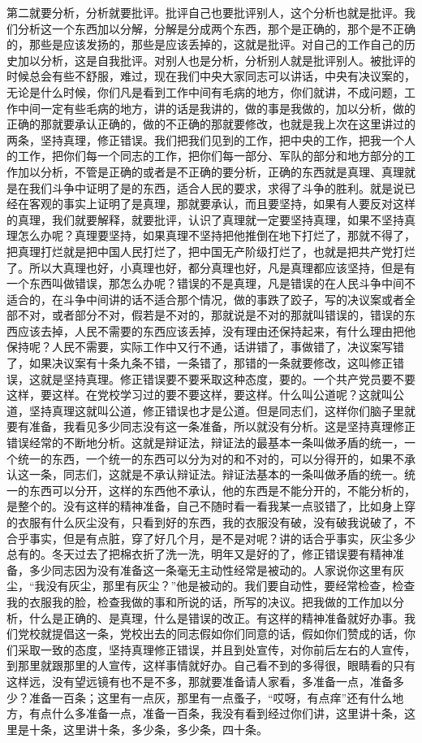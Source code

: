 第二就要分析，分析就要批评。批评自己也要批评别人，这个分析也就是批评。我们分析这一个东西加以分解，分解是分成两个东西，那个是正确的，那个是不正确的，那些是应该发扬的，那些是应该丢掉的，这就是批评。对自己的工作自己的历史加以分析，这是自我批评。对别人也是分析，分析别人就是批评别人。被批评的时候总会有些不舒服，难过，现在我们中央大家同志可以讲话，中央有决议案的，无论是什么时候，你们凡是看到工作中间有毛病的地方，你们就讲，不成问题，工作中间一定有些毛病的地方，讲的话是我讲的，做的事是我做的，加以分析，做的正确的那就要承认正确的，做的不正确的那就要修改，也就是我上次在这里讲过的两条，坚持真理，修正错误。我们把我们见到的工作，把中央的工作，把我一个人的工作，把你们每一个同志的工作，把你们每一部分、军队的部分和地方部分的工作加以分析，不管是正确的或者是不正确的要分析，正确的东西就是真理、真理就是在我们斗争中证明了是的东西，适合人民的要求，求得了斗争的胜利。就是说已经在客观的事实上证明了是真理，那就要承认，而且要坚持，如果有人要反对这样的真理，我们就要解释，就要批评，认识了真理就一定要坚持真理，如果不坚持真理怎么办呢？真理要坚持，如果真理不坚持把他推倒在地下打烂了，那就不得了，把真理打烂就是把中国人民打烂了，把中国无产阶级打烂了，也就是把共产党打烂了。所以大真理也好，小真理也好，都分真理也好，凡是真理都应该坚持，但是有一个东西叫做错误，那怎么办呢？错误的不是真理，凡是错误的在人民斗争中间不适合的，在斗争中间讲的话不适合那个情况，做的事跌了跤子，写的决议案或者全部不对，或者部分不对，假若是不对的，那就说是不对的那就叫错误的，错误的东西应该去掉，人民不需要的东西应该丢掉，没有理由还保持起来，有什么理由把他保持呢？人民不需要，实际工作中又行不通，话讲错了，事做错了，决议案写错了，如果决议案有十条九条不错，一条错了，那错的一条就要修改，这叫修正错误，这就是坚持真理。修正错误要不要釆取这种态度，要的。一个共产党员要不要这样，要这样。在党校学习过的要不要这样，要这样。什么叫公道呢？这就叫公道，坚持真理这就叫公道，修正错误也才是公道。但是同志们，这样你们脑子里就要有准备，我看见多少同志没有这一条准备，所以就没有分析。这是坚持真理修正错误经常的不断地分析。这就是辩证法，辩证法的最基本一条叫做矛盾的统一，一个统一的东西，一个统一的东西可以分为对的和不对的，可以分得开的，如果不承认这一条，同志们，这就是不承认辩证法。辩证法基本的一条叫做矛盾的统一。统一的东西可以分开，这样的东西他不承认，他的东西是不能分开的，不能分析的，是整个的。没有这样的精神准备，自己不随时看一看我某一点驳错了，比如身上穿的衣服有什么灰尘没有，只看到好的东西，我的衣服没有破，没有破我说破了，不合乎事实，但是有点脏，穿了好几个月，是不是对呢？讲的话合乎事实，灰尘多少总有的。冬天过去了把棉衣折了洗一洗，明年又是好的了，修正错误要有精神准备，多少同志因为没有准备这一条毫无主动性经常是被动的。人家说你这里有灰尘，“我没有灰尘，那里有灰尘？”他是被动的。我们要自动性，要经常检查，检查我的衣服我的脸，检查我做的事和所说的话，所写的决议。把我做的工作加以分析，什么是正确的、是真理，什么是错误的改正。有这样的精神准备就好办事。我们党校就提倡这一条，党校出去的同志假如你们同意的话，假如你们赞成的话，你们采取一致的态度，坚持真理修正错误，并且到处宣传，对你前后左右的人宣传，到那里就跟那里的人宣传，这样事情就好办。自己看不到的多得很，眼睛看的只有这样远，没有望远镜有也不是不多，那就要准备请人家看，多准备一点，准备多少？准备一百条；这里有一点灰，那里有一点蚤子，“哎呀，有点痒”还有什么地方，有点什么多准备一点，准备一百条，我没有看到经过你们讲，这里讲十条，这里是十条，这里讲十条，多少条，多少条，四十条。